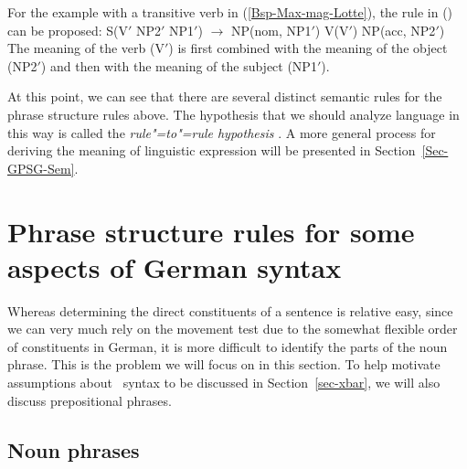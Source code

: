 \noindent
For the example with a transitive verb in (\ref{Bsp-Max-mag-Lotte}), the rule in () can be proposed:
\ea
S(V$'$ NP2$'$ NP1$'$) $\to$ NP(nom, NP1$'$) V(V$'$) NP(acc, NP2$'$)
\z
The meaning of the verb (V$'$) is first combined with the meaning of the object (NP2$'$) and then with the meaning of the subject (NP1$'$). 

At this point, we can see that there are several distinct semantic rules for the phrase structure rules above. The hypothesis that we should analyze language
in this way is called the \emph{rule"=to"=rule hypothesis}
\citep[]{Bach76a}. A more general process for deriving the
meaning of linguistic expression will be presented in Section~\ref{Sec-GPSG-Sem}.

\section{Phrase structure rules for some aspects of German syntax}

Whereas determining the direct constituents of a sentence is relative easy, since we can very much rely on the movement test due to the
somewhat flexible order of constituents in German, it is more difficult to identify the parts of the noun phrase. This is the problem
we will focus on in this section. To help motivate assumptions about \xbar~syntax to be discussed in Section~\ref{sec-xbar},
we will also discuss prepositional phrases.


\subsection{Noun phrases}
\label{sec-psg-np}

